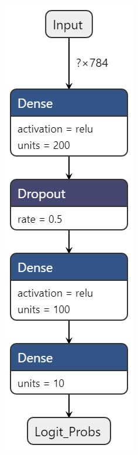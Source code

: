 \documentclass[11pt]{article}
\begin{document}
\begin{figure}[H]
\begin{subfigure}[c]{0.24\textwidth}
        \caption{}
        \label{fig:DNN2}
    \end{subfigure}
    \centering
    \begin{subfigure}[c]{0.24\textwidth}
        \centering
        \includegraphics[width = \textwidth]{normal3.png}

\end{subfigure}
\end{figure}
\end{document}
